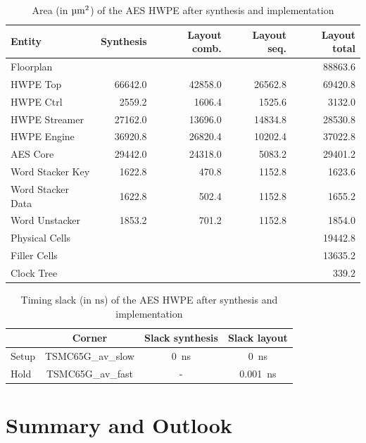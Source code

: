 \documentclass[a4paper, 12pt]{article}
\begin{document}
\begin{table}[h]
    \centering
    \begin{tabular}{l|r r r r}
        \toprule
        Entity &  Synthesis & Layout comb. & Layout seq. & Layout total \\
        \midrule
		Floorplan &  &  & & 88863.6 \\ 
		\hspace{2mm}HWPE Top & 66642.0 & 42858.0  & 26562.8 & 69420.8 \\ 
		\hspace{4mm}HWPE Ctrl & 2559.2 & 1606.4 & 1525.6 & 3132.0  \\ 
		\hspace{4mm}HWPE Streamer & 27162.0 & 13696.0 & 14834.8 & 28530.8 \\ 
		\hspace{4mm}HWPE Engine & 36920.8 & 26820.4 & 10202.4 & 37022.8 \\ 
		\hspace{6mm}AES Core & 29442.0 & 24318.0 & 5083.2 & 29401.2 \\ 
		\hspace{6mm}Word Stacker Key & 1622.8 & 470.8  & 1152.8 & 1623.6 \\ 
		\hspace{6mm}Word Stacker Data & 1622.8 & 502.4 & 1152.8 & 1655.2 \\ 
		\hspace{6mm}Word Unstacker & 1853.2 & 701.2 & 1152.8 & 1854.0 \\
		\hspace{2mm}Physical Cells &  &  & & 19442.8 \\ 
		\hspace{4mm}Filler Cells &  &  & & 13635.2 \\ 
		\hspace{4mm}Clock Tree &  &  & & 339.2\\ 
        \bottomrule
    \end{tabular}
	\caption{Area (in $\textrm{\micro m}^2$) of the AES HWPE after synthesis and implementation}
	\label{tab:results-area}
\end{table}

 

\begin{table}[h]
    \centering
    \begin{tabular}{l|c c c}
        \toprule
         & Corner &  Slack synthesis & Slack layout \\
        \midrule
		Setup & TSMC65G\_av\_slow & \SI{0}{ns} & \SI{0}{ns} \\ 
		Hold & TSMC65G\_av\_fast & - & \SI{0.001}{ns} \\ 
        \bottomrule
    \end{tabular}
	\caption{Timing slack (in $\textrm{ns}$) of the AES HWPE after synthesis and implementation}
	\label{tab:results-timing}
\end{table}


\section{Summary and Outlook} \label{sec:summary}

\clearpage
\sloppy
\printbibliography
\end{document}

